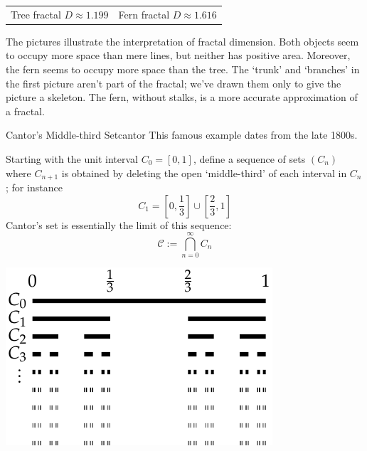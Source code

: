 \begin{example}{}{}
\begin{center}
\begin{tabular}{c@{\qquad\qquad}c}
			\\
			Tree fractal $D\approx 1.199$
			&
			Fern fractal $D\approx 1.616$
		\end{tabular}
	\end{center}
	The pictures illustrate the interpretation of fractal dimension. Both objects seem to occupy more space than mere lines, but neither has positive area. Moreover, the fern seems to occupy more space than the tree. The `trunk' and `branches' in the first picture aren't part of the fractal; we've drawn them only to give the picture a skeleton. The fern, without stalks, is a more accurate approximation of a fractal. 
\end{example}


\goodbreak


\begin{example}{Cantor's Middle-third Set}{cantor}
	This famous example dates from the late 1800s.\footnotemark{}\par
	\begin{minipage}[t]{0.58\linewidth}\vspace{-5pt}
		Starting with the unit interval $C_0=[0,1]$, define a sequence of sets $(C_n)$ where $C_{n+1}$ is obtained by deleting the open `middle-third' of each interval in $C_n$; for instance
		\[
			C_1=\left[0,\frac 13\right]\cup\left[\frac 23,1\right]
		\]
		Cantor's set is essentially the limit of this sequence:
		\[
			\mathcal C:=\bigcap_{n=0}^\infty C_n
		\]
	\end{minipage}
	\hfill
	\begin{minipage}[t]{0.4\linewidth}\vspace{-7pt}
		\flushright
	\href{http://www.math.uci.edu/~ndonalds/math161/cantor-similar.html}{\includegraphics{cantor-set}}
	\end{minipage}
	\medbreak


\end{example}
